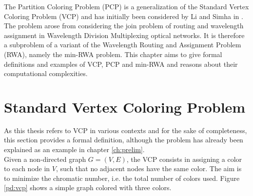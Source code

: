 
The Partition Coloring Problem (PCP) is a generalization of the Standard Vertex Coloring Problem (VCP) and has initially been considered by Li and Simha in \cite{li-00}. The problem arose from considering the join problem of routing and wavelength assignment in Wavelength Division Multiplexing optical networks. It is therefore a subproblem of a variant of the Wavelength Routing and Assignment Problem (RWA), namely the min-RWA problem. This chapter aims to give formal definitions and examples of VCP, PCP and min-RWA and reasons about their computational complexities.

\section{Standard Vertex Coloring Problem}
As this thesis refers to VCP in various contexts and for the sake of completeness, this section provides a formal definition, although the problem has already been explained as an example in chapter \ref{ch:prelim}. \\
Given a non-directed graph $G=(V,E)$, the VCP consists in assigning a color to each node in $V$, such that no adjacent nodes have the same color. The aim is to minimize the chromatic number, i.e. the total number of colors used. Figure \ref{pd:vcp} shows a simple graph colored with three colors.


